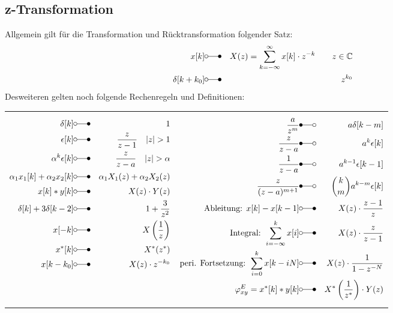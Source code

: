 \subsection{z-Transformation}
Allgemein gilt für die Transformation und Rücktransformation folgender Satz:
\begin{eqnarray*}
x[k] &\laplace& X(z) = \sum_{k = - \infty}^{\infty} x[k] \cdot z^{-k} \qquad z \in \mathbb{C} \\ 
\delta[k+k_0] &\laplace& z^{k_0} 
\end{eqnarray*}
Desweiteren gelten noch folgende Rechenregeln und Definitionen:
\begin{tabular}{ll}
 \addtolength{\jot}{2mm}
 \parbox{5cm}{\begin{eqnarray*}
 \delta[k] &\laplace& 1\\
  \epsilon[k] &\laplace& \frac{z}{z-1} \quad \text{$\vert z \vert > 1$}\\
  \alpha^k \epsilon[k] &\laplace& \frac{z}{z-a} \quad \text{$\vert z \vert > \alpha$}\\
  \alpha_1 x_1[k] +   \alpha_2 x_2[k] &\laplace& \alpha_1 X_1(z) + \alpha_2 X_2(z) \\
  x[k] \ast y[k] &\laplace&  X(z) \cdot Y(z) \\
  \delta[k]  + 3 \delta[k-2]  &\laplace& 1 + \frac{3}{z^2}\\
  x[-k]  &\laplace& X\left( \frac{1}{z}\right) \\
  x^*[k]  &\laplace& X^*(z^*)\\
  x[k-k_0]  &\laplace&  X(z) \cdot z^{-k_0}
 \end{eqnarray*}
}
 &
 \addtolength{\jot}{2mm}
 \parbox{5cm}{\begin{eqnarray*}
\frac{a}{z^m} &\Laplace& a \delta[k-m]\\
\frac{z}{z-a} &\Laplace& a^k \epsilon[k]\\
\frac{1}{z-a} &\Laplace& a^{k-1} \epsilon[k-1]\\
\frac{z}{(z-a)^{m+1}} &\Laplace& \binom{k}{m} a^{k-m} \epsilon[k]\\
\text{Ableitung: } x[k] - x[k-1] &\laplace& X(z) \cdot \frac{z-1}{z}\\
\text{Integral: } \sum_{i=-\infty}^k x[i] &\laplace& X(z) \cdot \frac{z}{z-1}\\
\text{peri. Fortsetzung: } \sum_{i=0}^k x[k-iN] &\laplace& X(z) \cdot \frac{1}{1-z^{-N}}\\
\varphi^E_{xy} = x^*[k] \ast y[k] &\laplace& X^*\left(\frac{1}{z^*}\right) \cdot Y(z)
 \end{eqnarray*}}
\end{tabular}\\
